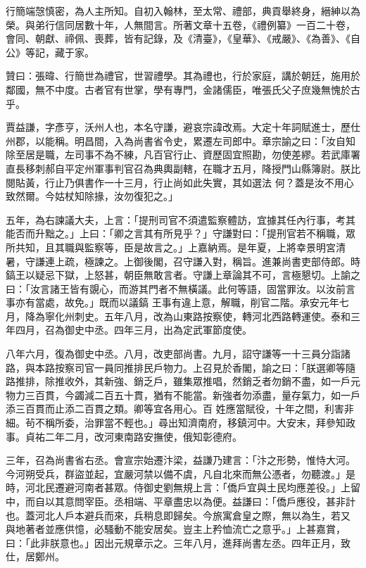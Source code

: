 \begin{pinyinscope}
 行簡端愨慎密，為人主所知。自初入翰林，至太常、禮部，典貢舉終身，縉紳以為榮。與弟行信同居數十年，人無間言。所著文章十五卷，《禮例纂》一百二十卷，會同、朝獻、禘佩、喪葬，皆有記錄，及《清臺》，《皇華》、《戒嚴》、《為善》、《自公》等記，藏于家。



 贊曰：張暐、行簡世為禮官，世習禮學。其為禮也，行於家庭，講於朝廷，施用於鄰國，無不中度。古者官有世掌，學有專門，金諸儒臣，唯張氏父子庶幾無愧於古乎。



 賈益謙，字彥亨，沃州人也，本名守謙，避哀宗諱改焉。大定十年詞賦進士，歷仕州郡，以能稱。明昌間，入為尚書省令史，累遷左司郎中。章宗諭之曰：「汝自知除至居是職，左司事不為不練，凡百官行止、資歷固宜照勘，勿使差繆。若武庫署直長移刺郝自平定州軍事判官召為典輿副轄，在職才五月，降授門山縣簿尉。朕比閱貼黃，行止乃俱書作一十三月，行止尚如此失實，其如選法
 何？蓋是汝不用心致然爾。今姑杖知除掾，汝勿復犯之。」



 五年，為右諫議大夫，上言：「提刑司官不須遣監察體訪，宜據其任內行事，考其能否而升黜之。」上曰：「卿之言其有所見乎？」守謙對曰：「提刑官若不稱職，眾所共知，且其職與監察等，臣是故言之。」上嘉納焉。是年夏，上將幸景明宮清暑，守謙連上疏，極諫之。上御後閣，召守謙入對，稱旨。進兼尚書吏部侍郎。時鎬王以疑忌下獄，上怒甚，朝臣無敢言者。守謙上章論其不可，言極懇切。上諭之曰：「汝言諸王皆有覬心，而游其門者不無橫議。此何等語，固當罪汝。以汝前言事亦有當處，故免。」既而以議鎬
 王事有違上意，解職，削官二階。承安元年七月，降為寧化州刺史。五年八月，改為山東路按察使，轉河北西路轉運使。泰和三年四月，召為御史中丞。四年三月，出為定武軍節度使。



 八年六月，復為御史中丞。八月，改吏部尚書。九月，詔守謙等一十三員分詣諸路，與本路按察司官一員同推排民戶物力。上召見於香閣，諭之曰：「朕選卿等隨路推排，除推收外，其新強、銷乏戶，雖集眾推唱，然銷乏者勿銷不盡，如一戶元物力三百貫，今蠲減二百五十貫，猶有不能當。新強者勿添盡，量存氣力，如一戶添三百貫而止添二百貫之類。卿等宜各用心。百
 姓應當賦役，十年之間，利害非細。茍不稱所委，治罪當不輕也。」尋出知濟南府，移鎮河中。大安末，拜參知政事。貞祐二年二月，改河東南路安撫使，俄知彰德府。



 三年，召為尚書省右丞。會宣宗始遷汴梁，益謙乃建言：「汴之形勢，惟恃大河。今河朔受兵，群盜並起，宜嚴河禁以備不虞，凡自北來而無公憑者，勿聽渡。」是時，河北民遷避河南者甚眾。侍御史劉無規上言：「僑戶宜與土民均應差役。」上留中，而自以其意問宰臣。丞相端、平章盡忠以為便。益謙曰：「僑戶應役，甚非計也。蓋河北人戶本避兵而來，兵稍息即歸矣。今旅寓倉皇之際，無以為生，若又
 與地著者並應供憶，必騷動不能安居矣。豈主上矜恤流亡之意乎。」上甚嘉賞，曰：「此非朕意也。」因出元規章示之。三年八月，進拜尚書左丞。四年正月，致仕，居鄭州。




\end{pinyinscope}
